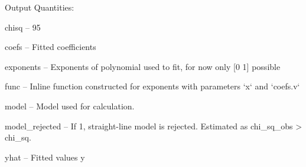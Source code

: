 \begin{tightdesc}
\begin{tightdesc}
    \end{tightdesc}
\item [Output Quantities:] \rule{0em}{0em}
    \begin{tightdesc}
        \item[\textsf{chisq}] -- 95 %
        \item[\textsf{coefs}] -- Fitted coefficients
        \item[\textsf{exponents}] -- Exponents of polynomial used to fit, for now only [0 1] possible
        \item[\textsf{func}] -- Inline function constructed for exponents with parameters `x` and `coefs.v`
        \item[\textsf{model}] -- Model used for calculation.
        \item[\textsf{model\_rejected}] -- If 1, straight-line model is rejected. Estimated as chi\_sq\_obs > chi\_sq.
        \item[\textsf{yhat}] -- Fitted values y
    \end{tightdesc}
\end{tightdesc}

